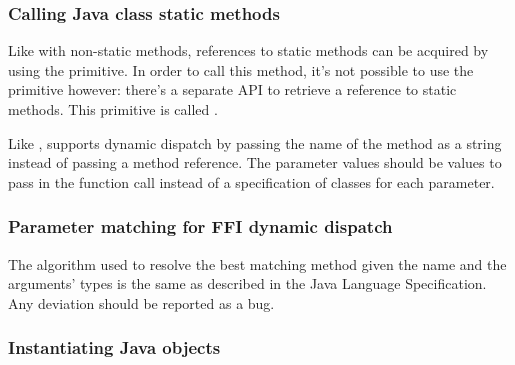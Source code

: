 \documentclass[10pt]{book}
\begin{document}

\subsubsection{Calling Java class static methods}

Like with non-static methods, references to static methods can be acquired
by using the  primitive. In order to call this method,
it's not possible to use the  primitive however: there's a 
separate API to retrieve a reference to static methods. This
primitive is called . 

Like ,  supports dynamic dispatch by
passing the name of the method as a string instead of passing a method reference.
The parameter values should be values to pass in the function call instead of
a specification of classes for each parameter.

\subsubsection{Parameter matching for FFI dynamic dispatch}

The algorithm used to resolve the best matching method given the name
and the arguments' types is the same as described in the Java Language
Specification. Any deviation should be reported as a bug.


\subsubsection{Instantiating Java objects}
\end{document}
